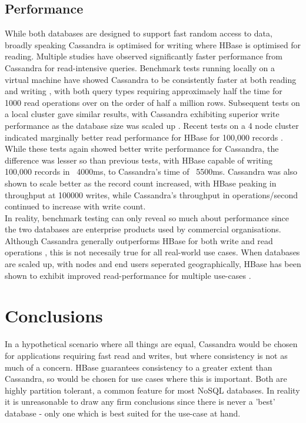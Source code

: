 \documentclass[10pt]{article}
\begin{document}
\subsection{Performance}
While both databases are designed to support fast random access to data, broadly speaking Cassandra is optimised for writing where HBase is optimised for reading. Multiple studies have observed significantly faster performance from Cassandra for read-intensive queries. Benchmark tests running locally on a virtual machine have showed Cassandra to be consistently faster at both reading and writing \citep{abrberfur2014}, with both query types requiring approximaely half the time for 1000 read operations over on the order of half a million rows. Subsequent tests on a local cluster gave similar results, with Cassandra exhibiting superior write performance as the database size was scaled up \citep{7507964}. Recent tests on a 4 node cluster indicated marginally better read performance for HBase for 100,000 records \citep{7979888}. While these tests again showed better write performance for Cassandra, the difference was lesser so than previous tests, with HBase capable of writing 100,000 records in ~4000ms, to Cassandra's time of ~5500ms. Cassandra was also shown to scale better as the record count increased, with HBase peaking in throughput at 100000 writes, while Cassandra's throughput in operations/second continued to increase with write count.\\

In reality, benchmark testing can only reveal so much about performance since the two databases are enterprise products used by commercial organisations. Although Cassandra generally outperforms HBase for both write and read operations \citep{DBLP:journals/corr/abs-1208-4167}, this is not necesaily true for all real-world use cases. When databases are scaled up, with nodes and end users seperated geographically, HBase has been shown to exhibit improved read-performance for multiple use-cases \citep{xu2017}.


\section{Conclusions}
In a hypothetical scenario where all things are equal, Cassandra would be chosen for applications requiring fast read and writes, but where consistency is not as much of a concern. HBase guarantees consistency to a greater extent than Cassandra, so would be chosen for use cases where this is important. Both are highly partition tolerant, a common feature for most NoSQL databases. In reality it is unreasonable to draw any firm conclusions since there is never a 'best' database - only one which is best suited for the use-case at hand.
\end{document}
